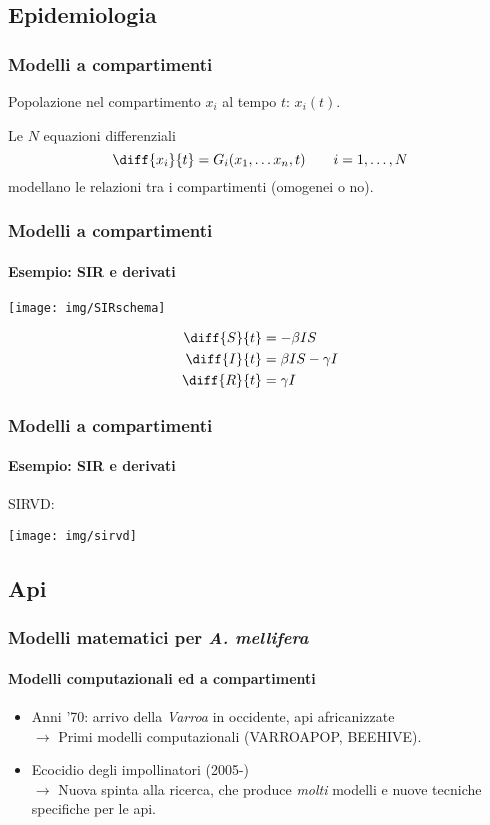 \documentclass[]{beamer}
\begin{document}
\subsection{Epidemiologia}


\begin{frame}
    \frametitle{Modelli a compartimenti}

    Popolazione nel compartimento $x_i$ al tempo $t$: $x_i(t)$.

    \pause
    Le $N$ equazioni differenziali
    $$ \diff{x_i}{t} = G_i (x_1, \dots x_n, t) \qquad i=1, \dots, N$$
    modellano le relazioni tra i compartimenti (omogenei o no).
\end{frame}


\begin{frame}
    \frametitle{Modelli a compartimenti}
    \framesubtitle{Esempio: SIR e derivati}

    \begin{center}
        \texttt{[image: img/SIRschema]}
    \end{center}

    \pause
    \begin{align*}
    \diff{S}{t} &= - \beta I S \\
    \diff{I}{t} &= \beta I S - \gamma I \\
    \diff{R}{t} &= \gamma I
    \end{align*}
\end{frame}

\begin{frame}
    \frametitle{Modelli a compartimenti}
    \framesubtitle{Esempio: SIR e derivati}

    SIRVD:
    \pause
    \begin{center}
        \texttt{[image: img/sirvd]}
    \end{center}
\end{frame}

\subsection{Api}


\begin{frame}
    \frametitle{Modelli matematici per \emph{A. mellifera}}
    \framesubtitle{Modelli computazionali ed a compartimenti}

    \begin{itemize}
    \item Anni '70: arrivo della \emph{Varroa} in occidente, api africanizzate \pause
        \\
        $\rightarrow$ Primi modelli computazionali (VARROAPOP, BEEHIVE).
    \item \pause Ecocidio degli impollinatori (2005-) \pause
        \\
        $\rightarrow$  Nuova spinta alla ricerca, che produce \emph{molti} modelli e
        nuove tecniche specifiche per le api.
    \end{itemize}
\end{frame}
\end{document}
